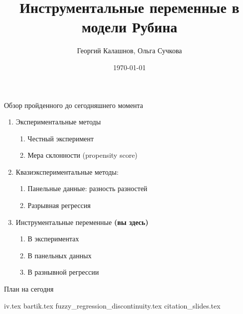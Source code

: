 \title{Инструментальные переменные в модели Рубина}
\author[Георгий Калашнов, Ольга Сучкова]{Георгий Калашнов, Ольга Сучкова}
\date{\today}



\begin{frame}
  \titlepage
  
\end{frame}




\begin{frame}{Обзор пройденного до сегодняшнего момента}
\begin{enumerate}
    \item Экспериментальные методы
    \begin{enumerate}
        \item Честный эксперимент
        \item Мера склонности (propensity score)
    \end{enumerate}
    \item Квазиэкспериментальные методы:
    \begin{enumerate}
        \item Панельные данные: разность разностей
        \item Разрывная регрессия
    \end{enumerate}
        \item Инструментальные переменные \textbf{(вы здесь)}
    \begin{enumerate}
        \item В экспериментах
        \item В панельных данных
        \item В разнывной регрессии
    \end{enumerate}
\end{enumerate}
\end{frame}

\begin{frame}{План на сегодня} 
\tableofcontents
\end{frame}


{iv.tex}
{bartik.tex}
{fuzzy_regression_discontinuity.tex}
{citation_slides.tex}





